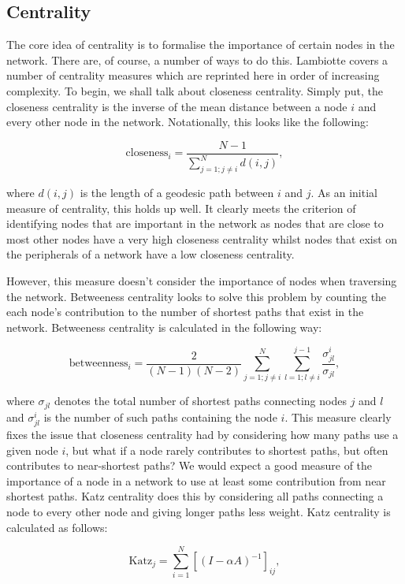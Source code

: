 \subsection{Centrality}
The core idea of centrality is to formalise the importance of certain nodes in the network. There are, of course, a number of ways to do this. Lambiotte covers a number of centrality measures \cite[18]{oxford:renaud_notes} which are reprinted here in order of increasing complexity. To begin, we shall talk about closeness centrality. Simply put, the closeness centrality is the inverse of the mean distance between a node $i$ and every other node in the network. Notationally, this looks like the following:

$$ \text{closeness}_i = \frac{N - 1}{\sum_{j=1; j\not=i}^N d(i, j)}, $$

where $d(i, j)$ is the length of a geodesic path between $i$ and $j$. As an initial measure of centrality, this holds up well. It clearly meets the criterion of identifying nodes that are important in the network as nodes that are close to most other nodes have a very high closeness centrality whilst nodes that exist on the peripherals of a network have a low closeness centrality.

However, this measure doesn't consider the importance of nodes when traversing the network. Betweeness centrality looks to solve this problem by counting the each node's contribution to the number of shortest paths that exist in the network. Betweeness centrality is calculated in the following way:

$$ \text{betweenness}_i = \frac{2}{(N-1)(N-2)}\sum_{j=1; j\not=i}^N \sum_{l=1; l\not=i}^{j-1} \frac{\sigma_{jl}^i}{\sigma_{jl}}, $$

where $\sigma_{jl}$ denotes the total number of shortest paths connecting nodes $j$ and $l$ and $\sigma^i_{jl}$ is the number of such paths containing the node $i$. This measure clearly fixes the issue that closeness centrality had by considering how many paths use a given node $i$, but what if a node rarely contributes to shortest paths, but often contributes to near-shortest paths? We would expect a good measure of the importance of a node in a network to use at least some contribution from near shortest paths. Katz centrality does this by considering all paths connecting a node to every other node and giving longer paths less weight. Katz centrality is calculated as follows:

$$ \text{Katz}_j = \sum_{i=1}^N[(I - \alpha A)^{-1}]_{ij}, $$

